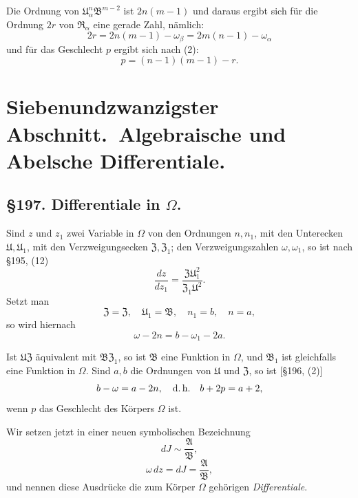 \documentclass[12pt,a4paper]{article}
\begin{document}
Die Ordnung von $\mathfrak{U}_\alpha^n \mathfrak{B}^{m-2}$ ist $2n(m-1)$ und daraus ergibt sich für die Ordnung $2r$ von $\mathfrak{R}_\alpha$ eine gerade Zahl, nämlich:
\[
2r = 2n(m-1) - \omega_\beta = 2m(n-1) - \omega_\alpha
\]
und für das Geschlecht $p$ ergibt sich nach (2):
\begin{equation}\label{eq:196-14}
p = (n-1)(m-1) - r.
\end{equation}

\newpage
\section*{Siebenundzwanzigster Abschnitt.\ Algebraische und Abelsche Differentiale.}

\subsection*{\S 197. Differentiale in $\Omega$.}

Sind $z$ und $z_1$ zwei Variable in $\Omega$ von den Ordnungen $n, n_1$, mit den Unterecken $\mathfrak{U}, \mathfrak{U}_1$, mit den Verzweigungsecken $\mathfrak{Z}, \mathfrak{Z}_1$; den Verzweigungszahlen $\omega, \omega_1$, so ist nach \S 195, (12)
\[
\frac{dz}{dz_1} = \frac{\mathfrak{Z} \mathfrak{U}_1^2}{\mathfrak{Z}_1 \mathfrak{U}^2}.
\]
Setzt man
\[
\mathfrak{Z} = \mathfrak{Z}, \quad \mathfrak{U}_1 = \mathfrak{B}, \quad n_1 = b, \quad n = a,
\]
so wird hiernach
\begin{equation}\label{eq:197-2}
\omega - 2n = b - \omega_1 - 2a.
\end{equation}

Ist $\mathfrak{U}\mathfrak{Z}$ äquivalent mit $\mathfrak{B}\mathfrak{Z}_1$, so ist $\mathfrak{B}$ eine Funktion in $\Omega$, und $\mathfrak{B}_1$ ist gleichfalls eine Funktion in $\Omega$. Sind $a, b$ die Ordnungen von $\mathfrak{U}$ und $\mathfrak{Z}$, so ist [\S 196, (2)]
\begin{equation}\label{eq:197-3}
b - \omega = a - 2n, \quad \text{d.\,h.} \quad b + 2p = a + 2,
\end{equation}
wenn $p$ das Geschlecht des Körpers $\Omega$ ist.

Wir setzen jetzt in einer neuen symbolischen Bezeichnung
\begin{equation}\label{eq:197-4}
dJ \sim \frac{\mathfrak{A}}{\mathfrak{B}},
\end{equation}
\begin{equation}\label{eq:197-5}
\omega\,dz = dJ = \frac{\mathfrak{A}}{\mathfrak{B}},
\end{equation}
und nennen diese Ausdrücke die zum Körper $\Omega$ gehörigen \emph{Differentiale}.
\end{document}
